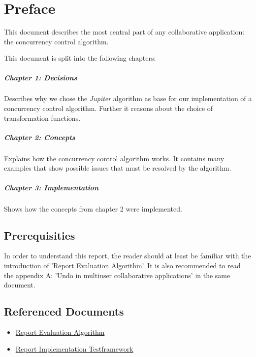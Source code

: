 \chapter*{Preface}
This document describes the most central part of any collaborative application: the concurrency control algorithm.

This document is split into the following chapters:

\paragraph{Chapter 1: Decisions} Describes why we chose the \emph{Jupiter} algorithm as base for our implementation of a concurrency control algorithm. Further it reasons about the choice of transformation functions.

\paragraph{Chapter 2: Concepts} Explains how the concurrency control algorithm works. It contains many examples that show possible issues that must be resolved by the algorithm.

\paragraph{Chapter 3: Implementation} Shows how the concepts from chapter 2 were implemented.

\section*{Prerequisities}
In order to understand this report, the reader should at least be familiar with the introduction of 'Report Evaluation Algorithm'. It is also recommended to read the appendix A: 'Undo in multiuser collaborative applications' in the same document.

\section*{Referenced Documents}
\begin{itemize}
 \item \href{http://ace.iserver.ch:81/repos/ace/ace/trunk/docs/pdf/algorithm.pdf}{Report Evaluation Algorithm}
 \item \href{http://ace.iserver.ch:81/repos/ace/ace/trunk/docs/pdf/testframework.pdf}{Report Implementation Testframework}
\end{itemize}
